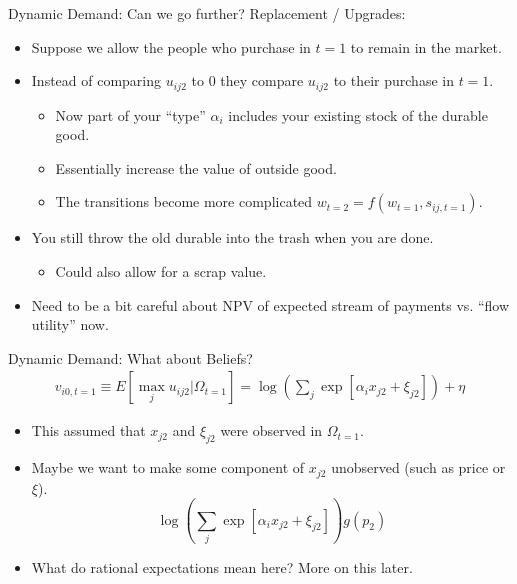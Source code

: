 \begin{frame}{Dynamic Demand: Can we go further?}
Replacement / Upgrades:
\begin{itemize}
\item Suppose we allow the people who purchase in $t=1$ to remain in the market.
\item Instead of comparing $u_{ij2}$ to $0$ they compare $u_{ij2}$ to their purchase in $t=1$.
\begin{itemize}
\item Now part of your ``type'' $\alpha_i$ includes your existing stock of the durable good.
\item Essentially increase the value of outside good.
\item The transitions become more complicated $w_{t=2} = f(w_{t=1},s_{ij,t=1})$.
\end{itemize}
\item You still throw the old durable into the trash when you are done.
\begin{itemize}
\item Could also allow for a scrap value.
\end{itemize}
\item Need to be a bit careful about NPV of expected stream of payments vs. ``flow utility'' now.
\end{itemize}
\end{frame}

\begin{frame}{Dynamic Demand: What about Beliefs?}
\begin{align*}
v_{i0,t=1} \equiv E [\max_j u_{ij2}  | \Omega_{t=1}] = \log \left( \sum_j \exp [ \alpha_i x_{j2}  +  \xi_{j2} ] \right) + \eta
\end{align*}

\begin{itemize}
\item This assumed that $x_{j2}$ and $\xi_{j2}$ were observed in $\Omega_{t=1}$.
\item Maybe we want to make some component of $x_{j2}$ \alert{unobserved} (such as price or $\xi$).
$$
\log \left( \sum_j \exp [ \alpha_i x_{j2}  +  \xi_{j2} ] \right)  g(p_2) 
$$
\item What do rational expectations mean here? More on this later.
\end{itemize}
\end{frame}




